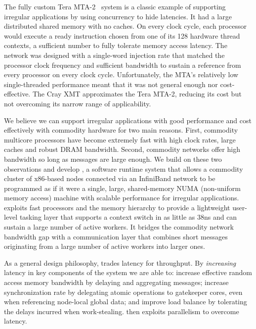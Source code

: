 The fully custom Tera MTA-2~\cite{tera:mta1} system is a classic example of
supporting irregular applications by using concurrency to hide latencies. It
had a large distributed shared memory with no caches. On every clock cycle,
each processor would execute a ready instruction chosen from one of its 128
hardware thread contexts, a sufficient number to fully tolerate memory access
latency. The network was designed with a single-word injection rate that
matched the processor clock frequency and sufficient bandwidth to sustain a
reference from every processor on every clock cycle. Unfortunately, the MTA's relatively low single-threaded performance meant that it
was not general enough nor cost-effective. The Cray XMT approximates the Tera
MTA-2, reducing its cost but not overcoming its narrow range of applicability.

We believe we can support irregular applications with good performance and cost effectively with commodity hardware for two main reasons. First, commodity multicore processors have become extremely fast with high clock rates, large caches and robust DRAM bandwidth. Second, commodity networks offer high bandwidth so long as messages are large enough. We build on these two observations and develop \Grappa, a software runtime system that allows a commodity cluster of x86-based nodes connected via an InfiniBand network to be programmed as if it were a single, large, shared-memory NUMA (non-uniform memory access) machine with scalable performance for irregular applications. \Grappa exploits fast processors and the memory hierarchy to provide a lightweight user-level tasking layer that supports a context switch in as little as 38ns and can sustain a large number of active workers. It bridges the commodity network bandwidth gap with a communication layer that combines short messages originating from a large number of active workers into larger ones.

As a general design philosophy, \Grappa trades latency for throughput.  By \emph{increasing} latency in key components of the system we are able to: increase effective random access memory bandwidth by delaying and aggregating messages; increase synchronization rate by delegating atomic operations to gatekeeper cores, even when referencing node-local global data; and improve load balance by tolerating the delays incurred when work-stealing.  \Grappa then exploits parallelism to overcome latency.


